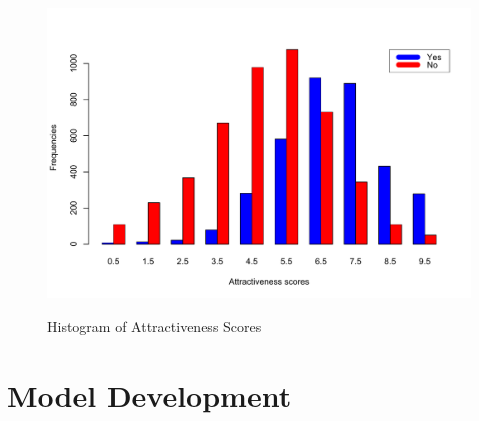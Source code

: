 \documentclass{article}
\begin{document}
\begin{figure}[H]
	\caption{Histogram of Attractiveness Scores}
	\includegraphics[scale=0.50]{AttractivenessScores}
	\centering
	\label{fig:attractiveness}
\end{figure}
\section{Model Development}
\end{document}
